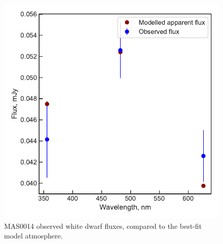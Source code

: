 \begin{figure}
    \centering
    \includegraphics[width=\textwidth]{figures/results/MASOT0014/fluxplot.pdf}
    \caption{MAS0014 observed white dwarf fluxes, compared to the best-fit model atmosphere.}
    \label{fig:MAS0014 flux plot}
\end{figure}




